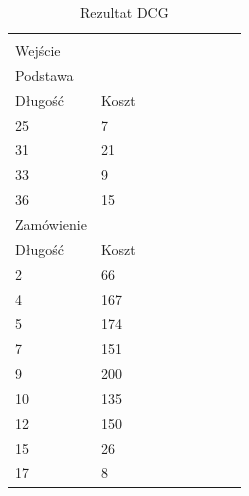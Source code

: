 \clearpage
\begin{longtable}{lllllllll}
\caption{Rezultat DCG}\label{tab:dcg_result} \\
\hline \\
Wejście                   &              &           &                  &    &    &    &   &    \\
Podstawa             &              &           &                  &    &    &    &   &    \\
Długość                   & Koszt         &           &                  &    &    &    &   &    \\
25                       & 7            &           &                  &    &    &    &   &    \\
31                       & 21           &           &                  &    &    &    &   &    \\
33                       & 9            &           &                  &    &    &    &   &    \\
36                       & 15           &           &                  &    &    &    &   &    \\
Zamówienie     &              &           &                  &    &    &    &   &    \\
Długość                   & Koszt     &           &                  &    &    &    &   &    \\
2                        & 66           &           &                  &    &    &    &   &    \\
4                        & 167          &           &                  &    &    &    &   &    \\
5                        & 174          &           &                  &    &    &    &   &    \\
7                        & 151          &           &                  &    &    &    &   &    \\
9                        & 200          &           &                  &    &    &    &   &    \\
10                       & 135          &           &                  &    &    &    &   &    \\
12                       & 150          &           &                  &    &    &    &   &    \\
15                       & 26           &           &                  &    &    &    &   &    \\
17                       & 8            &           &                  &    &    &    &   &    \\

\end{longtable}
